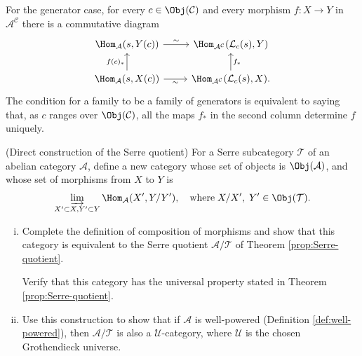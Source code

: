 \begin{Exercises}
	\begin{hint}
		For the generator case, for every $c\in\Obj(\mathcal{C})$ and every
		morphism $f:X\to Y$ in $\mathcal{A}^{\mathcal{C}}$ there is a
		commutative diagram
		\[\begin{tikzcd}
			\Hom_{\mathcal{A}}(s, Y(c)) \arrow[r, "\sim"] & \Hom_{\mathcal{A}^{\mathcal{C}}}(\mathcal{L}_c(s), Y) \\
			\Hom_{\mathcal{A}}(s, X(c)) \arrow[r, "\sim"'] \arrow[u, "{f(c)_*}"] & \Hom_{\mathcal{A}^{\mathcal{C}}}(\mathcal{L}_c(s), X) \arrow[u, "{f_*}"'] .
		\end{tikzcd}\]
		The condition for a family to be a family of generators is equivalent
		to saying that, as $c$ ranges over $\Obj(\mathcal{C})$, all the maps
		$f_*$ in the second column determine $f$ uniquely.
	\end{hint}

	\item (Direct construction of the Serre quotient) For a Serre subcategory
	$\mathcal{T}$ of an abelian category $\mathcal{A}$, define a new category
	whose set of objects is $\Obj(\mathcal{A})$, and whose set of morphisms
	from $X$ to $Y$ is
	\[ \varinjlim_{X' \subset X, Y' \subset Y} \Hom_{\mathcal{A}}(X', Y/Y'),
	\quad \text{where}\; X/X',\;Y'\in\Obj(\mathcal{T}). \]
	\begin{enumerate}[(i)]
		\item Complete the definition of composition of morphisms and show that
		this category is equivalent to the Serre quotient
		$\mathcal{A}/\mathcal{T}$ of Theorem \ref{prop:Serre-quotient}.
		\begin{hint}
			Verify that this category has the universal property stated in
			Theorem \ref{prop:Serre-quotient}.
		\end{hint}
		\item Use this construction to show that if $\mathcal{A}$ is
		well-powered (Definition \ref{def:well-powered}), then
		$\mathcal{A}/\mathcal{T}$ is also a $\mathcal{U}$-category, where
		$\mathcal{U}$ is the chosen Grothendieck universe.
	\end{enumerate}


\end{Exercises}
